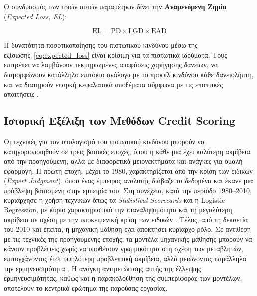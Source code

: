 Ο συνδυασμός των τριών αυτών παραμέτρων δίνει την
\textbf{Αναμενόμενη Ζημία} (\textit{Expected Loss, EL}):

\begin{equation}
  \text{EL} = \text{PD} \times \text{LGD} \times \text{EAD}
  \label{eq:expected_loss}
\end{equation}

Η δυνατότητα ποσοτικοποίησης του πιστωτικού κινδύνου μέσω της
εξίσωσης~\eqref{eq:expected_loss} είναι κρίσιμη για τα πιστωτικά
ιδρύματα. Τους επιτρέπει να λαμβάνουν τεκμηριωμένες αποφάσεις
χορήγησης δανείων, να διαμορφώνουν κατάλληλο επιτόκιο ανάλογα με το
προφίλ κινδύνου κάθε δανειολήπτη, και να διατηρούν επαρκή κεφαλαιακά
αποθέματα σύμφωνα με τις εποπτικές απαιτήσεις \citep{mcneil2015}.

\subsection{Ιστορική Εξέλιξη των Μεθόδων Credit Scoring}
\label{subsec:credit_scoring_history}

Οι τεχνικές για τον υπολογισμό του πιστωτικού κινδύνου μπορούν να 
κατηγοριοποιηθούν σε τρεις βασικές εποχές, όπου η κάθε μια έχει 
καλύτερη ακρίβεια από την προηγούμενη, αλλά με διαφορετικά 
μειονεκτήματα και ανάγκες για ομαλή εφαρμογή. Η πρώτη εποχή, μέχρι 
το 1980, χαρακτηρίζεται από την κρίση των ειδικών 
(\textit{Expert Judgment}), όπου ένας έμπειρος αναλυτής διάβαζε τα 
δεδομένα και έκανε μια πρόβλεψη βασισμένη στην εμπειρία του. Στη 
συνέχεια, κατά την περίοδο 1980--2010, κυριάρχησε η χρήση τεχνικών 
όπως τα \textit{Statistical Scorecards} και η Logistic Regression, με 
κύριο χαρακτηριστικό την επαναληψιμότητα και τη μεγαλύτερη ακρίβεια 
σε σχέση με την υποκειμενική κρίση των ειδικών \citep{thomas2000}. 
Τέλος, από τη δεκαετία του 2010 και έπειτα, η μηχανική μάθηση έχει 
αποκτήσει κυρίαρχο ρόλο. Σε αντίθεση με τις τεχνικές της 
προηγούμενης εποχής, τα μοντέλα μηχανικής μάθησης μπορούν να κάνουν 
προβλέψεις χωρίς να υποθέτουν γραμμικότητα στη σχέση των 
μεταβλητών, επιτυγχάνοντας έτσι υψηλότερη προβλεπτική ακρίβεια, 
αλλά μειώνοντας παράλληλα την ερμηνευσιμότητα \citep{hastie2009}. 
Η ανάγκη αντιμετώπισης αυτής της έλλειψης ερμηνευσιμότητας, καθώς 
και η παρακολούθηση της συμπεριφοράς των μοντέλων, αποτελούν το 
κεντρικό ερώτημα της παρούσας εργασίας.

